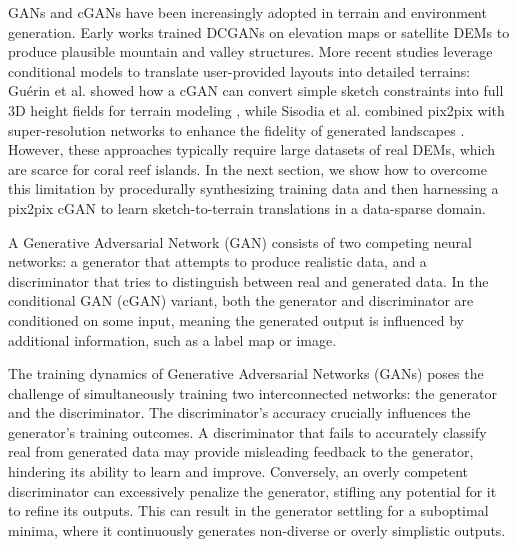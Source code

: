 GANs and cGANs have been increasingly adopted in terrain and environment generation.  Early works trained DCGANs on elevation maps or satellite DEMs to produce plausible mountain and valley structures.  More recent studies leverage conditional models to translate user-provided layouts into detailed terrains: Guérin et al. showed how a cGAN can convert simple sketch constraints into full 3D height fields for terrain modeling \cite{Guerin2017}, while Sisodia et al. combined pix2pix with super-resolution networks to enhance the fidelity of generated landscapes \cite{Sisodia2022}.  However, these approaches typically require large datasets of real DEMs, which are scarce for coral reef islands.  In the next section, we show how to overcome this limitation by procedurally synthesizing training data and then harnessing a pix2pix cGAN to learn sketch-to-terrain translations in a data-sparse domain.






A Generative Adversarial Network (GAN) consists of two competing neural networks: a generator that attempts to produce realistic data, and a discriminator that tries to distinguish between real and generated data. In the conditional GAN (cGAN) variant, both the generator and discriminator are conditioned on some input, meaning the generated output is influenced by additional information, such as a label map or image.



The training dynamics of Generative Adversarial Networks (GANs) poses the challenge of simultaneously training two interconnected networks: the generator and the discriminator. The discriminator's accuracy crucially influences the generator's training outcomes. A discriminator that fails to accurately classify real from generated data may provide misleading feedback to the generator, hindering its ability to learn and improve. Conversely, an overly competent discriminator can excessively penalize the generator, stifling any potential for it to refine its outputs. This can result in the generator settling for a suboptimal minima, where it continuously generates non-diverse or overly simplistic outputs.

